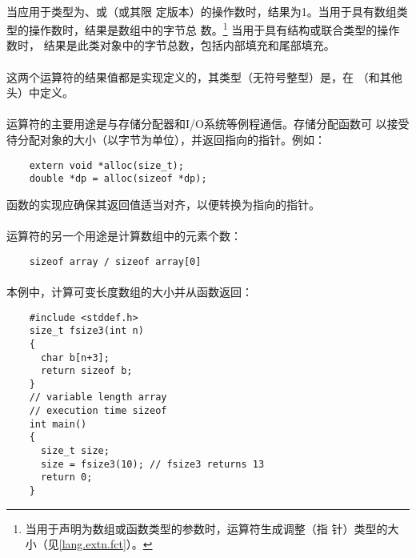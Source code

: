 \paragraph{}
当应用于类型为、或（或其限
定版本）的操作数时，结果为1。当用于具有数组类型的操作数时，结果是数组中的字节总
数。\footnote{当用于声明为数组或函数类型的参数时，运算符生成调整（指
针）类型的大小（见\ref{lang.extn.fct}）。} 当用于具有结构或联合类型的操作数时，
结果是此类对象中的字节总数，包括内部填充和尾部填充。

\paragraph{}
这两个运算符的结果值都是实现定义的，其类型（无符号整型）是，在
（和其他头）中定义。

\paragraph{}
\ex {}运算符的主要用途是与存储分配器和I/O系统等例程通信。存储分配函数可
以接受待分配对象的大小（以字节为单位），并返回指向的指针。例如：
\begin{lstlisting}
    extern void *alloc(size_t);
    double *dp = alloc(sizeof *dp);
\end{lstlisting}
函数的实现应确保其返回值适当对齐，以便转换为指向的指针。

\paragraph{}
\ex {}运算符的另一个用途是计算数组中的元素个数：
\begin{lstlisting}
    sizeof array / sizeof array[0]
\end{lstlisting}

\paragraph{}
\ex 本例中，计算可变长度数组的大小并从函数返回：
\begin{lstlisting}
    #include <stddef.h>
    size_t fsize3(int n)
    {
      char b[n+3];
      return sizeof b;
    }
    // variable length array
    // execution time sizeof
    int main()
    {
      size_t size;
      size = fsize3(10); // fsize3 returns 13
      return 0;
    }
\end{lstlisting}

